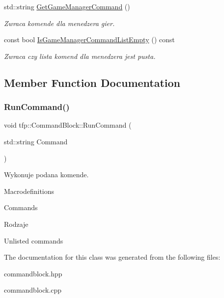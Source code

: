 \begin{DoxyCompactItemize}
\mbox{\label{classtfp_1_1_command_block_a84298fbd9c4515d4c4fd4cb6c2bc4320}} 
std\+::string \mbox{\hyperlink{classtfp_1_1_command_block_a84298fbd9c4515d4c4fd4cb6c2bc4320}{Get\+Game\+Manager\+Command}} ()
\begin{DoxyCompactList}\small\item\em Zwraca komende dla menedzera gier. \end{DoxyCompactList}\item 
\mbox{\label{classtfp_1_1_command_block_ad7b89f3ab84cbf4ce59e39bb499ed95b}} 
const bool \mbox{\hyperlink{classtfp_1_1_command_block_ad7b89f3ab84cbf4ce59e39bb499ed95b}{Is\+Game\+Manager\+Command\+List\+Empty}} () const
\begin{DoxyCompactList}\small\item\em Zwraca czy lista komend dla menedzera jest pusta. \end{DoxyCompactList}\end{DoxyCompactItemize}


\subsection{Member Function Documentation}
\mbox{\label{classtfp_1_1_command_block_ab87816104ea217209676d5e6788921a1}} 
\subsubsection{\texorpdfstring{Run\+Command()}{RunCommand()}}
{\footnotesize\ttfamily void tfp\+::\+Command\+Block\+::\+Run\+Command (\begin{DoxyParamCaption}\item[{std\+::string}]{Command }\end{DoxyParamCaption})}



Wykonuje podana komende. 

Macrodefinitions

Commands

Rodzaje

Unlisted commands 

The documentation for this class was generated from the following files\+:\begin{DoxyCompactItemize}
\item 
commandblock.\+hpp\item 
commandblock.\+cpp\end{DoxyCompactItemize}
